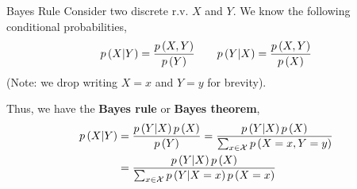 \documentclass[aspectratio=169]{beamer}
\def\mc{\ensuremath\mathcal}
\def\lp{\ensuremath\left(}
\def\rp{\ensuremath\right)}
\begin{document}
\begin{frame}{Bayes Rule}
  Consider two discrete r.v. $X$ and $Y$. We know the following conditional probabilities,
  \[ p\lp X \vert Y \rp =  \frac{p\lp X, Y\rp}{p\lp Y \rp} \quad \quad p\lp Y \vert X \rp =  \frac{p\lp X, Y\rp}{p\lp X \rp} \]
  (Note: we drop writing $X=x$ and $Y=y$ for brevity).

  Thus, we have the \textbf{Bayes rule} or \textbf{Bayes theorem},
  \[ \begin{split}
    p\lp X \vert Y \rp &= \frac{p\lp Y \vert X \rp p\lp X\rp}{p\lp Y \rp} = \frac{p\lp Y \vert X \rp p\lp X\rp}{\sum_{x \in \mc{X}} p\lp X = x, Y = y\rp}\\
                       &= \frac{p\lp Y \vert X \rp p\lp X\rp}{\sum_{x \in \mc{X}} p\lp Y \vert X = x\rp p\lp X = x \rp}  \\
  \end{split} \]
\end{frame}
\end{document}
